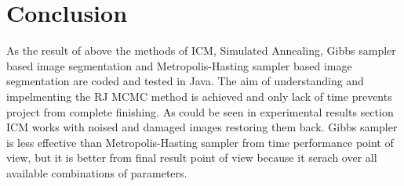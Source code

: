 \documentclass[journal]{IEEEtran}
\begin{document}
%


\section{Conclusion}
As the result of above the methods of ICM, Simulated Annealing, Gibbs sampler based image segmentation and Metropolis-Hasting sampler based image segmentation are coded and tested in Java. The aim of understanding and impelmenting the RJ MCMC method is achieved and only lack of time prevents project from complete finishing. As could be seen in experimental results section ICM works with noised and damaged images restoring them back. Gibbs sampler is less effective than Metropolis-Hasting sampler from time performance point of view, but it is better from final result point of view because it serach over all available combinations of parameters.


\end{document}
